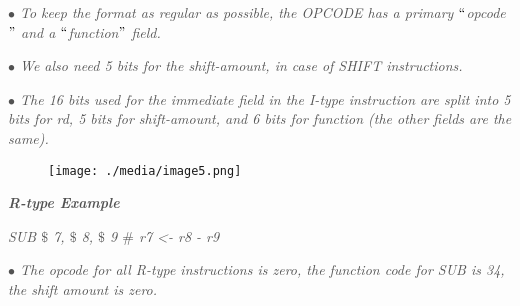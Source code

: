 \documentclass[12pt]{article}
\begin{document}
\begin{adjustwidth}{0.5in}{0.0in}
\textit{\textcolor[HTML]{525252}{$\bullet$  To keep the format as regular as possible, the OPCODE has a primary $``$opcode$"$  and a $``$function$"$  field. }}\par

\end{adjustwidth}

\textit{\textcolor[HTML]{525252}{$\bullet$  We also need 5 bits for the shift-amount, in case of SHIFT instructions. }}\par

\begin{adjustwidth}{0.5in}{0.0in}
\textit{\textcolor[HTML]{525252}{$\bullet$  The 16 bits used for the immediate field in the I-type instruction are split into 5 bits for rd, 5 bits for shift-amount, and 6 bits for function (the other fields are the same).}}\par

\end{adjustwidth}




\begin{figure}[H]
	\begin{Center}
		\texttt{[image: ./media/image5.png]}
	\end{Center}
\end{figure}



\par

{\fontsize{14pt}{16.8pt}\selectfont \textbf{\textit{\textcolor[HTML]{525252}{R-type Example}}}\par}\par

\begin{Center}
\textit{\textcolor[HTML]{525252}{SUB $\$$ 7, $\$$ 8, $\$$ 9 $\#$  r7 <- r8 - r9}}
\end{Center}\par

\begin{adjustwidth}{0.5in}{0.0in}
\textit{\textcolor[HTML]{525252}{$\bullet$  The opcode for all R-type instructions is zero, the function code for SUB is 34, the shift amount is zero.}}\par

\end{adjustwidth}
\end{document}
